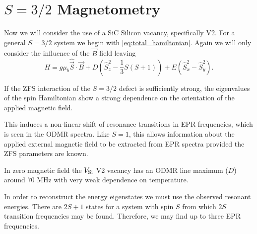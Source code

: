 \section{$S = 3/2$ Magnetometry}
Now we will consider the use of a SiC Silicon vacancy, specifically V2.
For a general $S=3/2$ system we begin with \eqref{eq:total_hamiltonian}.
Again we will only consider the influence of the $\vec{B}$ field leaving
\begin{equation}
	H = g\mu_b \hat{\vec{S}}\cdot\vec{B} + D\left(\hat{S}_z^2 - \frac{1}{3}S(S+1)\right) + E(\hat{S}_x^2 - \hat{S}_y^2).
	\label{eq:s1.5_magnetometry_hamiltonian}
\end{equation}

\cite{PhysRevApplied.4.014009}
\cite{PhysRevB.92.115201}
\cite{1505.06914}

If the ZFS interaction of the $S=3/2$ defect is sufficiently strong, the eigenvalues of the
spin Hamiltonian show a strong dependence on the orientation of the applied magnetic field.

This induces a non-linear shift of resonance transitions in EPR frequencies, which is seen in the ODMR spectra. Like $S=1$, this allows information about the applied external magnetic field to be extracted from EPR spectra provided the ZFS parameters are known.

In zero magnetic field the $V_{\ce{Si}}$ V2 vacancy has an ODMR line maximum ($D$) around 70 MHz with very weak dependence on temperature.


In order to
reconstruct the energy eigenstates we must use the observed resonant energies. There are $2S +1 $ states for a system with spin $S$ from which $2S$ transition frequencies may be found. Therefore, we may find up to three EPR frequencies.



%

